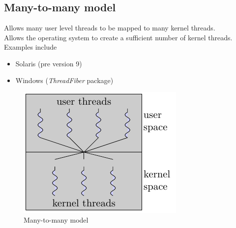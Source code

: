 \documentclass{book/custombook}
\begin{document}
            \subsection{Many-to-many model}
                Allows many user level threads to be mapped to many kernel threads.\\
                Allows the operating system to create a sufficient number of kernel threads.\\
                Examples include
                \begin{itemize}
                    \item Solaris (pre version 9)
                    \item Windows (\textit{ThreadFiber} package)
                \end{itemize}
                \begin{figure}[H]
                    \centering
                    \includegraphics{figures/many_to_many.pdf}
                    \caption{Many-to-many model}
                \end{figure}
\end{document}
